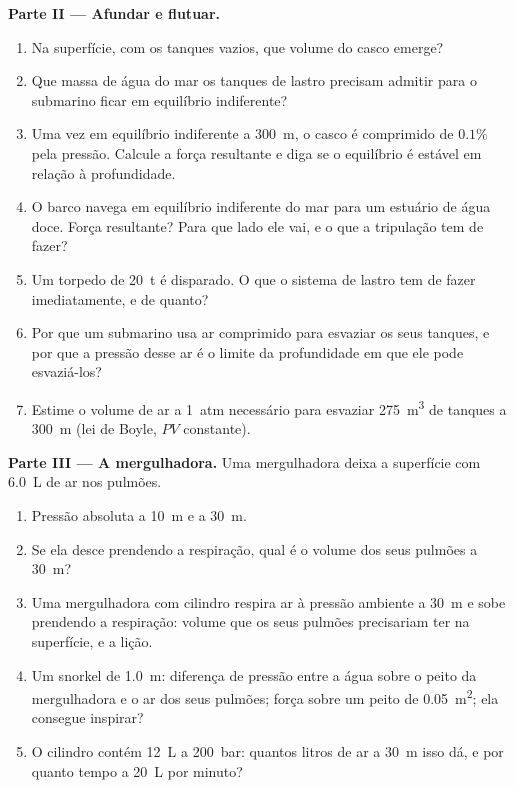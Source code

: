 \begin{problem}
\medskip
\noindent\textbf{Parte II --- Afundar e flutuar.}
\begin{enumerate}[resume]
  \item Na superfície, com os tanques vazios, que volume do casco emerge?
  \item Que massa de água do mar os tanques de lastro precisam admitir para
        o submarino ficar em equilíbrio indiferente?
  \item Uma vez em equilíbrio indiferente a \qty{300}{m}, o casco é
        comprimido de $0.1\%$ pela pressão. Calcule a força resultante e
        diga se o equilíbrio é estável em relação à profundidade.
  \item O barco navega em equilíbrio indiferente do mar para um estuário de
        água doce. Força resultante? Para que lado ele vai, e o que a
        tripulação tem de fazer?
  \item Um torpedo de \qty{20}{t} é disparado. O que o sistema de lastro
        tem de fazer imediatamente, e de quanto?
  \item Por que um submarino usa ar comprimido para esvaziar os seus
        tanques, e por que a pressão desse ar é o limite da profundidade
        em que ele pode esvaziá-los?
  \item Estime o volume de ar a \qty{1}{atm} necessário para esvaziar
        \qty{275}{m^3} de tanques a \qty{300}{m} (lei de Boyle, $PV$
        constante).
\end{enumerate}

\medskip
\noindent\textbf{Parte III --- A mergulhadora.}
Uma mergulhadora deixa a superfície com \qty{6.0}{L} de ar nos pulmões.
\begin{enumerate}[resume]
  \item Pressão absoluta a \qty{10}{m} e a \qty{30}{m}.
  \item Se ela desce prendendo a respiração, qual é o volume dos seus
        pulmões a \qty{30}{m}?
  \item Uma mergulhadora com cilindro respira ar à pressão ambiente a
        \qty{30}{m} e sobe prendendo a respiração: volume que os seus
        pulmões precisariam ter na superfície, e a lição.
  \item Um snorkel de \qty{1.0}{m}: diferença de pressão entre a água
        sobre o peito da mergulhadora e o ar dos seus pulmões; força sobre
        um peito de \qty{0.05}{m^2}; ela consegue inspirar?
  \item O cilindro contém \qty{12}{L} a \qty{200}{bar}: quantos litros
        de ar a \qty{30}{m} isso dá, e por quanto tempo a
        \qty{20}{L} por minuto?
\end{enumerate}


\end{problem}
